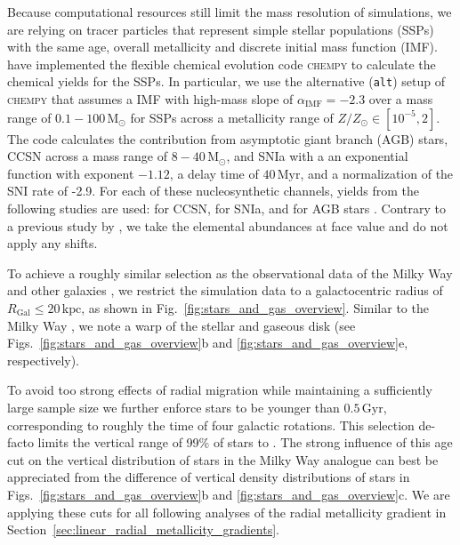 \documentclass[fleqn,usenatbib]{mnras}
\newcommand{\nihaoAGEmax}{$0.5\,\mathrm{Gyr}$}
\begin{document}
Because computational resources still limit the mass resolution of simulations, we are relying on tracer particles that represent simple stellar populations (SSPs) with the same age, overall metallicity and discrete initial mass function (IMF). \citet{Buck2021} have implemented the flexible chemical evolution code \textsc{chempy} \citep{Rybizki2017} to calculate the chemical yields for the SSPs. In particular, we use the alternative (\texttt{alt}) setup of \textsc{chempy} that assumes a \citet{Chabrier2003} IMF with high-mass slope of $\alpha_\text{IMF} = -2.3$ over a mass range of $0.1-100\,\mathrm{M_\odot}$ for SSPs across a metallicity range of $Z/Z_\odot \in [10^{-5},2]$. The code calculates the contribution from asymptotic giant branch (AGB) stars, CCSN across a mass range of $8-40\,\mathrm{M_\odot}$, and SNIa with a an exponential function with exponent $-1.12$, a delay time of $40\,\mathrm{Myr}$, and a normalization of the SNI rate of -2.9. For each of these nucleosynthetic channels, yields from the following studies are used: \citet{Chieffi2004} for CCSN, \citet{Seitenzahl2013} for SNIa, and \citet{Karakas2016} for AGB stars \citep[\texttt{new\_fit} model in][]{Buck2021}. Contrary to a previous study by \citet{Buder2024}, we take the elemental abundances at face value and do not apply any shifts.

To achieve a roughly similar selection as the observational data of the Milky Way \citep{Genovali2014} and other galaxies \citep[e.g.][]{Chen2023}, we restrict the simulation data to a galactocentric radius of $R_\mathrm{Gal} \leq 20\,\mathrm{kpc}$, as shown in Fig.~\ref{fig:stars_and_gas_overview}. Similar to the Milky Way \citep{Poggio2018, Lemasle2022}, we note a warp of the stellar and gaseous disk (see Figs.~\ref{fig:stars_and_gas_overview}b and \ref{fig:stars_and_gas_overview}e, respectively).

To avoid too strong effects of radial migration \citep{Binney2008, Frankel2018, Grand2016} while maintaining a sufficiently large sample size we further enforce stars to be younger than \nihaoAGEmax, corresponding to roughly the time of four galactic rotations. This selection de-facto limits the vertical range of 99\% of stars to . The strong influence of this age cut on the vertical distribution of stars in the Milky Way analogue can best be appreciated from the difference of vertical density distributions of stars in Figs.~\ref{fig:stars_and_gas_overview}b and \ref{fig:stars_and_gas_overview}c. We are applying these cuts for all following analyses of the radial metallicity gradient in Section~\ref{sec:linear_radial_metallicity_gradients}.
\end{document}
